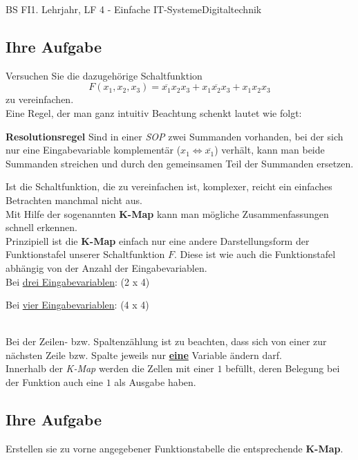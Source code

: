 \documentclass[11pt,twocolumn,oneside,openany,headings=optiontotoc,11pt,numbers=noenddot]{article}
\begin{document}
\begin{worksheet}{BS FI}{1. Lehrjahr, LF 4 - Einfache IT-Systeme}{Digitaltechnik}
		\subsection*{Ihre Aufgabe} Versuchen Sie die dazugehörige Schaltfunktion \[F(x_1,x_2,x_3) = \overline{x_1}x_2x_3 + x_1\overline{x_2}x_3 + x_1x_2x_3\] zu vereinfachen.\\
		Eine Regel, der man ganz intuitiv Beachtung schenkt lautet wie folgt:
		\begin{framed} \textbf{Resolutionsregel} Sind in einer \textit{SOP} zwei Summanden vorhanden, bei der sich nur eine Eingabevariable komplementär (\(x_1 \Leftrightarrow \overline{x_1}\)) verhält, kann man beide Summanden streichen und durch den gemeinsamen Teil der Summanden ersetzen.\end{framed}
		\noindent
		Ist die Schaltfunktion, die zu vereinfachen ist, komplexer, reicht ein einfaches Betrachten manchmal nicht aus.\\
		Mit Hilfe der sogenannten \textbf{K-Map} kann man mögliche Zusammenfassungen schnell erkennen.\\
		Prinzipiell ist die \textbf{K-Map} einfach nur eine andere Darstellungsform der Funktionstafel unserer Schaltfunktion \(F\). Diese ist wie auch die Funktionstafel abhängig von der Anzahl der Eingabevariablen.\\
		\newpage\noindent
		Bei \underline{drei Eingabevariablen}: (2 x 4)\\
		\par\noindent
		\begin{karnaugh-map}[4][2][1][$x_2x_3$][$x_1$]
			
		\end{karnaugh-map}
		\par\noindent
		Bei \underline{vier Eingabevariablen}: (4 x 4)\\
		\par\noindent
		\begin{karnaugh-map}[4][4][1][$x_3x_4$][$x_1x_2$]
			
		\end{karnaugh-map}\\
		Bei der Zeilen- bzw. Spaltenzählung ist zu beachten, dass sich von einer zur nächsten Zeile bzw. Spalte jeweils nur \underline{\textbf{eine}} Variable ändern darf.\\
		Innerhalb der \textit{K-Map} werden die Zellen mit einer \(1\) befüllt, deren Belegung bei der Funktion auch eine \(1\) als Ausgabe haben.
		\subsection*{Ihre Aufgabe}	Erstellen sie zu vorne angegebener Funktionstabelle die entsprechende \textbf{K-Map}.
		

\end{worksheet}
\end{document}
